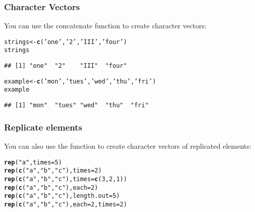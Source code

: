 \documentclass[12pt]{beamer}\usepackage[]{graphicx}\usepackage[]{color}
\makeatletter
\newcommand{\hlnum}[1]{\textcolor[rgb]{0.686,0.059,0.569}{#1}}%
\newcommand{\hlstr}[1]{\textcolor[rgb]{0.192,0.494,0.8}{#1}}%
\newcommand{\hlstd}[1]{\textcolor[rgb]{0.345,0.345,0.345}{#1}}%
\newcommand{\hlkwb}[1]{\textcolor[rgb]{0.69,0.353,0.396}{#1}}%
\newcommand{\hlkwc}[1]{\textcolor[rgb]{0.333,0.667,0.333}{#1}}%
\newcommand{\hlkwd}[1]{\textcolor[rgb]{0.737,0.353,0.396}{\textbf{#1}}}%
\newenvironment{kframe}{%
 \def\at@end@of@kframe{}%
 \ifinner\ifhmode%
  \def\at@end@of@kframe{\end{minipage}}%
  \begin{minipage}{\columnwidth}%
 \fi\fi%
 \def\FrameCommand##1{\hskip\@totalleftmargin \hskip-\fboxsep
 \colorbox{shadecolor}{##1}\hskip-\fboxsep
     \hskip-\linewidth \hskip-\@totalleftmargin \hskip\columnwidth}%
 \MakeFramed {\advance\hsize-\width
   \@totalleftmargin\z@ \linewidth\hsize
   \@setminipage}}%
 {\par\unskip\endMakeFramed%
 \at@end@of@kframe}
\newenvironment{knitrout}{}{} %
\makeatother
\begin{document}
\begin{frame}[fragile]
\frametitle{Character Vectors}

You can use the concatenate function {\hilit {}} to create character vectors:
\begin{knitrout}\footnotesize
{}\color{fgcolor}\begin{kframe}
\begin{alltt}
\hlstd{strings} \hlkwb{<-} \hlkwd{c}\hlstd{(}\hlstr{'one'}\hlstd{,} \hlstr{'2'}\hlstd{,} \hlstr{'III'}\hlstd{,} \hlstr{'four'}\hlstd{)}
\hlstd{strings}
\end{alltt}
\begin{verbatim}
## [1] "one"  "2"    "III"  "four"
\end{verbatim}
\begin{alltt}
\hlstd{example} \hlkwb{<-} \hlkwd{c}\hlstd{(}\hlstr{'mon'}\hlstd{,} \hlstr{'tues'}\hlstd{,} \hlstr{'wed'}\hlstd{,} \hlstr{'thu'}\hlstd{,} \hlstr{'fri'}\hlstd{)}
\hlstd{example}
\end{alltt}
\begin{verbatim}
## [1] "mon"  "tues" "wed"  "thu"  "fri"
\end{verbatim}
\end{kframe}
\end{knitrout}

\end{frame}


\begin{frame}[fragile]
\frametitle{Replicate elements}

You can also use the function {\hilit {}} to create character vectors of replicated elements:
\begin{knitrout}\footnotesize
{}\color{fgcolor}\begin{kframe}
\begin{alltt}
\hlkwd{rep}\hlstd{(}\hlstr{"a"}\hlstd{,} \hlkwc{times} \hlstd{=} \hlnum{5}\hlstd{)}
\hlkwd{rep}\hlstd{(}\hlkwd{c}\hlstd{(}\hlstr{"a"}\hlstd{,} \hlstr{"b"}\hlstd{,} \hlstr{"c"}\hlstd{),} \hlkwc{times} \hlstd{=} \hlnum{2}\hlstd{)}
\hlkwd{rep}\hlstd{(}\hlkwd{c}\hlstd{(}\hlstr{"a"}\hlstd{,} \hlstr{"b"}\hlstd{,} \hlstr{"c"}\hlstd{),} \hlkwc{times} \hlstd{=} \hlkwd{c}\hlstd{(}\hlnum{3}\hlstd{,} \hlnum{2}\hlstd{,} \hlnum{1}\hlstd{))}
\hlkwd{rep}\hlstd{(}\hlkwd{c}\hlstd{(}\hlstr{"a"}\hlstd{,} \hlstr{"b"}\hlstd{,} \hlstr{"c"}\hlstd{),} \hlkwc{each} \hlstd{=} \hlnum{2}\hlstd{)}
\hlkwd{rep}\hlstd{(}\hlkwd{c}\hlstd{(}\hlstr{"a"}\hlstd{,} \hlstr{"b"}\hlstd{,} \hlstr{"c"}\hlstd{),} \hlkwc{length.out} \hlstd{=} \hlnum{5}\hlstd{)}
\hlkwd{rep}\hlstd{(}\hlkwd{c}\hlstd{(}\hlstr{"a"}\hlstd{,} \hlstr{"b"}\hlstd{,} \hlstr{"c"}\hlstd{),} \hlkwc{each} \hlstd{=} \hlnum{2}\hlstd{,} \hlkwc{times} \hlstd{=} \hlnum{2}\hlstd{)}
\end{alltt}
\end{kframe}
\end{knitrout}

\end{frame}
\end{document}
